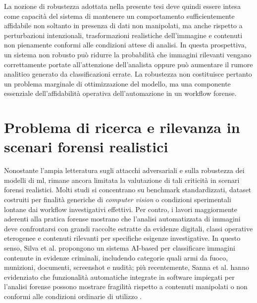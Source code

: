 La nozione di robustezza adottata nella presente tesi deve quindi essere intesa come capacità del sistema di mantenere un comportamento sufficientemente affidabile non soltanto in presenza di dati non manipolati, ma anche rispetto a perturbazioni intenzionali, trasformazioni realistiche dell'immagine e contenuti non pienamente conformi alle condizioni attese di analisi. In questa prospettiva, un sistema non robusto può ridurre la probabilità che immagini rilevanti vengano correttamente portate all'attenzione dell'analista oppure può aumentare il rumore analitico generato da classificazioni errate. La robustezza non costituisce pertanto un problema marginale di ottimizzazione del modello, ma una componente essenziale dell'affidabilità operativa dell'automazione in un workflow forense.


\section{Problema di ricerca e rilevanza in scenari forensi realistici}
Nonostante l'ampia letteratura sugli attacchi adversariali e sulla robustezza dei modelli di \gls{ml}, rimane ancora limitata la valutazione di tali criticità in scenari forensi realistici. Molti studi si concentrano su benchmark standardizzati, dataset costruiti per finalità generiche di \textit{computer vision} o condizioni sperimentali lontane dai workflow investigativi effettivi. Per contro, i lavori maggiormente aderenti alla pratica forense mostrano che l'analisi automatizzata di immagini deve confrontarsi con grandi raccolte estratte da evidenze digitali, classi operative eterogenee e contenuti rilevanti per specifiche esigenze investigative. In questo senso, Silva et al. propongono un sistema AI-based per classificare immagini contenute in evidenze criminali, includendo categorie quali armi da fuoco, munizioni, documenti, screenshot e nudità; più recentemente, Sanna et al. hanno evidenziato che funzionalità automatiche integrate in software impiegati per l'analisi forense possono mostrare fragilità rispetto a contenuti manipolati o non conformi alle condizioni ordinarie di utilizzo \cite{silva2021microservices,sanna2024preliminary,sanna2025pixelperfect}.

